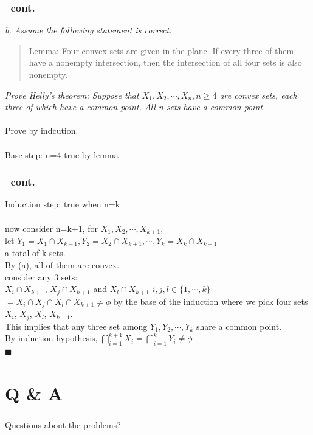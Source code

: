 \documentclass[handout]{beamer}
\begin{document}
\begin{frame}[t]
  \frametitle{\subsecname\ cont.}
  \textit{b. Assume the following statement is correct:}\\ \pause
  \begin{quote} 
  Lemma: Four convex sets are given in the plane. If every three of them have a nonempty intersection, then the intersection of all four sets is also nonempty.
  \end{quote}\pause
  \textit{Prove Helly's theorem: Suppose that $X_1, X_2, \cdots, X_n, n\geq4$ are convex sets, each three of which have a common point. All n sets have a common point.}\\ \pause
  $\;$\\
\alert{Prove by indcution.}\\ \pause
$\;$\\
Base step: n=4 true by lemma
\end{frame}

\begin{frame}[t]
  \frametitle{\subsecname\ cont.}
Induction step: true when n=k\\ \pause $\;$\\
now consider n=k+1, for $X_1,X_2,\cdots,X_{k+1}$,\\ \pause
let $Y_1=X_1\cap X_{k+1},Y_2=X_2\cap X_{k+1},\cdots,Y_k=X_k\cap X_{k+1}$\\
\hfill a total of k sets.\\ \pause
By (a), all of them are convex. \\ \pause
consider any 3 sets:\\
$X_i \cap X_{k+1}$, $X_j \cap X_{k+1}$ and $X_l \cap X_{k+1}$ $i, j, l \in \{1,\cdots,k\} $ \pause
$=X_i \cap X_{j}\cap X_{l}\cap X_{k+1} \neq \phi$ by the base of the induction where we pick four sets $X_i$, $X_{j}$, $X_{l}$, $X_{k+1}$.\\ \pause
This implies that any three set among $Y_1, Y_2, \cdots, Y_k$ share a common point.\\ \pause
By induction hypothesis,
$\bigcap_{i=1}^{k+1}X_i=\bigcap_{i=1}^{k}Y_i\neq\phi$ \\
\hfill $\blacksquare$
\end{frame}


\section*{Q \& A}
\begin{frame}[c]
  \frametitle{\secname}
  \begin{center}
    \Huge{Questions about the problems?}
    \end{center}
\end{frame}
\end{document}

